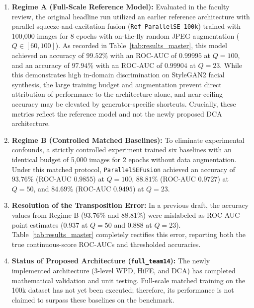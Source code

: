 \documentclass[11pt,a4paper]{article}
\begin{document}
\begin{enumerate}
    \item \textbf{Regime A (Full-Scale Reference Model):} Evaluated in the faculty review, the original headline run utilized an earlier reference architecture with parallel squeeze-and-excitation fusion (\texttt{Ref\_ParallelSE\_100k}) trained with 100,000 images for 8 epochs with on-the-fly random JPEG augmentation ($Q \in [60, 100]$). As recorded in Table~\ref{tab:results_master}, this model achieved an accuracy of $99.52\%$ with an ROC-AUC of $0.99995$ at $Q=100$, and an accuracy of $97.94\%$ with an ROC-AUC of $0.99904$ at $Q=23$. While this demonstrates high in-domain discrimination on StyleGAN2 facial synthesis, the large training budget and augmentation prevent direct attribution of performance to the architecture alone, and near-ceiling accuracy may be elevated by generator-specific shortcuts. Crucially, these metrics reflect the reference model and not the newly proposed DCA architecture.
    \item \textbf{Regime B (Controlled Matched Baselines):} To eliminate experimental confounds, a strictly controlled experiment trained six baselines with an identical budget of 5,000 images for 2 epochs without data augmentation. Under this matched protocol, \texttt{ParallelSEFusion} achieved an accuracy of $93.76\%$ (ROC-AUC $0.9855$) at $Q=100$, $88.81\%$ (ROC-AUC $0.9727$) at $Q=50$, and $84.69\%$ (ROC-AUC $0.9495$) at $Q=23$.
    \item \textbf{Resolution of the Transposition Error:} In a previous draft, the accuracy values from Regime B ($93.76\%$ and $88.81\%$) were mislabeled as ROC-AUC point estimates ($0.937$ at $Q=50$ and $0.888$ at $Q=23$). Table~\ref{tab:results_master} completely rectifies this error, reporting both the true continuous-score ROC-AUCs and thresholded accuracies.
    \item \textbf{Status of Proposed Architecture (\texttt{full\_team14}):} The newly implemented architecture (3-level WPD, HiFE, and DCA) has completed mathematical validation and unit testing. Full-scale matched training on the 100k dataset has not yet been executed; therefore, its performance is not claimed to surpass these baselines on the benchmark.
\end{enumerate}
\end{document}
